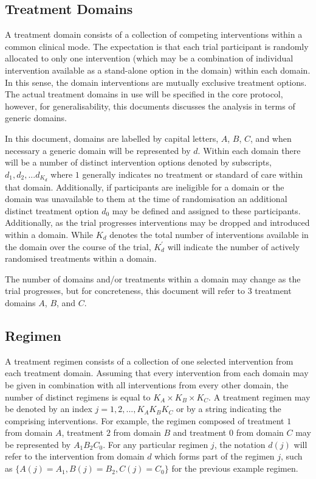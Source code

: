 \documentclass[
  11pt,
]{article}
\begin{document}
\hypertarget{treatment-domains}{%
\subsection{Treatment Domains}\label{treatment-domains}}

A treatment domain consists of a collection of competing interventions within a common clinical mode.
The expectation is that each trial participant is randomly allocated to only one intervention (which may be a combination of individual intervention available as a stand-alone option in the domain) within each domain.
In this sense, the domain interventions are mutually exclusive treatment options.
The actual treatment domains in use will be specified in the core protocol, however, for generalisability, this documents discusses the analysis in terms of generic domains.

In this document, domains are labelled by capital letters, \(A\), \(B\), \(C\), and when necessary a generic domain will be represented by \(d\).
Within each domain there will be a number of distinct intervention options denoted by subscripts, \(d_1, d_2,...d_{K_d}\) where \(1\) generally indicates no treatment or standard of care within that domain. Additionally, if participants are ineligible for a domain or the domain was unavailable to them at the time of randomisation an additional distinct treatment option \(d_{0}\) may be defined and assigned to these participants. Additionally, as the trial progresses interventions may be dropped and introduced within a domain. While \(K_d\) denotes the total number of interventions available in the domain over the course of the trial, \(K_d^\prime\) will indicate the number of actively randomised treatments within a domain.

The number of domains and/or treatments within a domain may change as the trial progresses, but for concreteness, this document will refer to 3 treatment domains \(A\), \(B\), and \(C\).

\hypertarget{regimen}{%
\subsection{Regimen}\label{regimen}}

A treatment regimen consists of a collection of one selected intervention from each treatment domain.
Assuming that every intervention from each domain may be given in combination with all interventions from every other domain, the number of distinct regimens is equal to \(K_A\times K_B\times K_C\).
A treatment regimen may be denoted by an index \(j = 1,2,...,K_AK_BK_C\) or by a string indicating the comprising interventions.
For example, the regimen composed of treatment \(1\) from domain \(A\), treatment \(2\) from domain \(B\) and treatment \(0\) from domain \(C\) may be represented by \(A_1B_2C_0\).
For any particular regimen \(j\), the notation \(d(j)\) will refer to the intervention from domain \(d\) which forms part of the regimen \(j\), such as \(\{A(j)=A_1,B(j)=B_2,C(j)=C_0\}\) for the previous example regimen.
\end{document}
